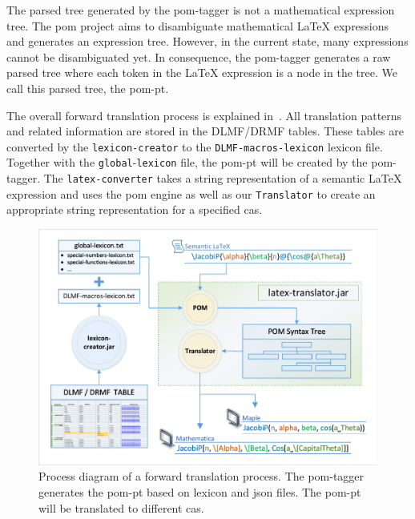 \documentclass[a4paper,11pt]{article}
\theoremstyle{defTheoStyle}
\theoremstyle{defExampStyle}
\begin{document}
The parsed tree generated by the \gls*{pom}-tagger is not a mathematical expression tree. The \gls*{pom} project aims to disambiguate mathematical \LaTeX{} expressions and generates an expression tree. However, in the current state, many expressions cannot be disambiguated yet. In consequence, the \gls*{pom}-tagger generates a raw parsed tree where each token in the \LaTeX{} expression is a node in the tree. We call this parsed tree, the \gls*{pom-pt}.

{\sloppy The overall forward translation process is explained in~. All translation patterns and related information are stored in the DLMF/DRMF tables. These tables are converted by the \verb|lexicon-creator| to the \verb|DLMF-macros-lexicon| lexicon file. Together with the \verb|global|-\verb|lexicon| file, the \gls*{pom-pt} will be created by the \gls*{pom}-tagger. The \verb|latex-converter| takes a string representation of a semantic \LaTeX{} expression and uses the \gls*{pom} engine as well as our \verb|Translator| to create an appropriate string representation for a specified \gls*{cas}.}

\begin{figure}[ht]
	\vspace{-10pt}
	\centering
	\includegraphics[clip, trim=0.2cm 0.2cm 0.2cm 0.2cm, scale=0.72]{ForwardTranslationProcess.pdf}
	\caption{Process diagram of a forward translation process. The \gls*{pom}-tagger generates the \gls*{pom-pt} based on lexicon and \gls*{json} files. The \gls*{pom-pt} will be translated to different \gls*{cas}.}
	\label{fig:forward-trans}
	\vspace{-10pt}
\end{figure}
\end{document}
